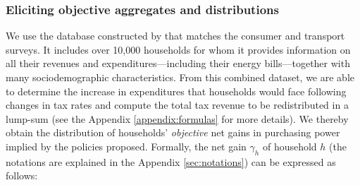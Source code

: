 \documentclass[12pt]{article} %
\begin{document}

\subsubsection{Eliciting objective aggregates and distributions \label{subsubsec:comparing-obj-subj}}


We use the database constructed by \citet{douenne_2020} that matches the consumer and transport surveys. It includes over 10,000 households for whom it provides information on all their revenues and expenditures---including their energy bills---together with many sociodemographic characteristics. From this combined dataset, we are able to determine the increase in expenditures that households would face following changes in tax rates and compute the total tax revenue to be redistributed in a lump-sum (see the Appendix \ref{appendix:formulas} for more details). We thereby obtain the distribution of households' \textit{objective} net gains in purchasing power implied by the policies proposed. Formally, the net gain $\gamma_h$ of household $h$ (the notations are explained in the Appendix \ref{sec:notations}) can be expressed as follows:
\end{document}
